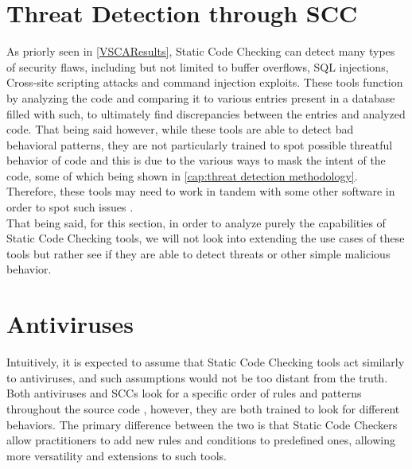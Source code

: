 \section{Threat Detection through SCC} \label{tdtscc}

As priorly seen in \ref{VSCAResults}, Static Code Checking can detect many types of security flaws, including but not limited to buffer overflows, SQL injections, Cross-site scripting attacks and command injection exploits. These tools function by analyzing the code and comparing it to various entries present in a database filled with such, to ultimately find discrepancies between the entries and analyzed code. That being said however, while these tools are able to detect bad behavioral patterns, they are not particularly trained to spot possible threatful behavior of code and this is due to the various ways to mask the intent of the code, some of which being shown in \ref{cap:threat detection methodology}. Therefore, these tools may need to work in tandem with some other software in order to spot such issues \cite{wagner2000intrusion}.\\

\noindent That being said, for this section, in order to analyze purely the capabilities of Static Code Checking tools, we will not look into extending the use cases of these tools but rather see if they are able to detect threats or other simple malicious behavior.




\section{Antiviruses}

Intuitively, it is expected to assume that Static Code Checking tools act similarly to antiviruses, and such assumptions would not be too distant from the truth. Both antiviruses and SCCs look for a specific order of rules and patterns throughout the source code \cite{stefanovic2020static}, however, they are both trained to look for different behaviors. The primary difference between the two is that Static Code Checkers allow practitioners to add new rules and conditions to predefined ones, allowing more versatility and extensions to such tools.

